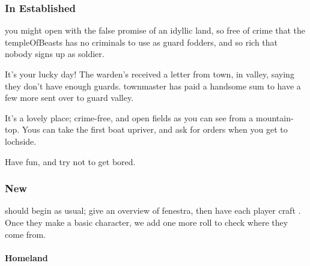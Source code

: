 \begin{multicols}{2}
\subsubsection{In Established }
you might open with the false promise of an idyllic land, so free of crime that the \gls{templeOfBeasts} has no criminals to use as \gls{guard} \glspl{fodder}, and so rich that nobody signs up as  \gls{soldier}.

\begin{speechtext}
  It's your lucky day!
  The \gls{warden}'s received a letter from \gls{town}, in \gls{valley}, saying they don't have enough \glspl{guard}.
  \Gls{townmaster} has paid a handsome sum to have a few more sent over to guard \gls{valley}.

  It's a lovely place; crime-free, and open fields as you can see from a mountain-top.
  Yous can take the first boat upriver, and ask for orders when you get to \gls{lochside}.

  Have fun, and try not to get bored.
\end{speechtext}

\subsubsection{New }
should begin as usual; give an overview of \gls{fenestra},%
then have each player craft .%
Once they make a basic character, we add one more roll to check where they come from.

\paragraph{Homeland}


\end{multicols}
